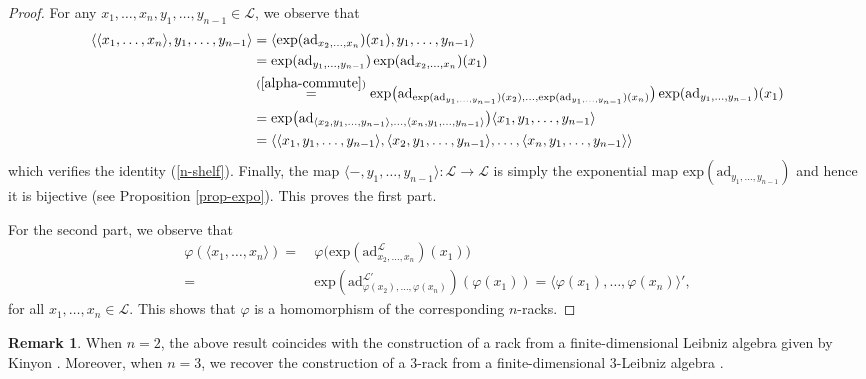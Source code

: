 \documentclass[a4paper,reqno,10pt]{amsart}
\theoremstyle{plain}
\theoremstyle{definition}
\newtheorem{remark}[thm]{Remark}
\theoremstyle{remark}
\begin{document}
\begin{proof}
    For any $x_1, \ldots, x_n, y_1, \ldots, y_{n-1} \in \mathcal{L}$, we observe that
    \begin{align*}
        \langle \langle x_1, \ldots, x_n \rangle, y_1, \ldots, y_{n-1} \rangle 
        &= \langle \mathrm{exp} (\mathrm{ad}_{x_2, \ldots, x_n} ) (x_1), y_1, \ldots, y_{n-1} \rangle \\
        &= \mathrm{exp} (\mathrm{ad}_{y_1, \ldots, y_{n-1}} ) ~ \! \mathrm{exp} (\mathrm{ad}_{x_2, \ldots, x_n} )(x_1) \\
        &\stackrel{(\ref{alpha-commute})}{=} \mathrm{exp} \big(  \mathrm{ad}_{ \mathrm{exp} (\mathrm{ad}_{y_1, \ldots, y_{n-1}} ) (x_2), \ldots, \mathrm{exp} (\mathrm{ad}_{y_1, \ldots, y_{n-1}} ) (x_n)   }   \big) ~ \! \mathrm{exp} (\mathrm{ad}_{y_1, \ldots, y_{n-1}} ) (x_1) \\
        &= \mathrm{exp} \big( \mathrm{ad}_{  \langle x_2, y_1, \ldots, y_{n-1} \rangle   , \ldots, \langle x_n, y_1, \ldots, y_{n-1} \rangle  } \big) \langle x_1, y_1, \ldots, y_{n-1} \rangle  \\
        &= \langle \langle x_1, y_1, \ldots, y_{n-1} \rangle , \langle x_2, y_1, \ldots, y_{n-1} \rangle , \ldots, \langle x_n, y_1, \ldots, y_{n-1} \rangle \rangle
    \end{align*}
    which verifies the identity (\ref{n-shelf}). Finally, the map $\langle - , y_1, \ldots, y_{n-1} \rangle : \mathcal{L} \rightarrow \mathcal{L}$ is simply the exponential map $\mathrm{exp} (\mathrm{ad}_{y_1, \ldots, y_{n-1}})$ and hence it is bijective (see Proposition \ref{prop-expo}). This proves the first part.

    For the second part, we observe that
    \begin{align*}
        \varphi ( \langle x_1, \ldots, x_n \rangle ) =~& \varphi \big(   \mathrm{exp} (\mathrm{ad}^\mathcal{L}_{x_2, \ldots, x_n}) (x_1)  \big) \\
        =~&  \mathrm{exp} (\mathrm{ad}^{\mathcal{L}'}_{\varphi(x_2), \ldots, \varphi( x_n)}) ( \varphi(x_1)) = \langle    \varphi (x_1), \ldots, \varphi (x_n) \rangle',
    \end{align*}
    for all $x_1, \ldots, x_{n} \in \mathcal{L}$. This shows that $\varphi$ is a homomorphism of the corresponding $n$-racks.
\end{proof}

\begin{remark}
    When $n = 2$, the above result coincides with the construction of a rack from a finite-dimensional Leibniz algebra given by Kinyon \cite{kinyon}.  Moreover, when $n=3$, we recover the construction of a $3$-rack from a finite-dimensional $3$-Leibniz algebra \cite{xu-sheng}.
\end{remark}
\end{document}
